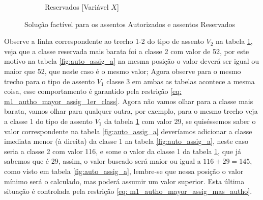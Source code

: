 \begin{figure}[H]
\begin{subfigure}[b]{0.35\linewidth}
		\caption{Reservados [Variável $X$]}
		\label{fig:auto_assig_b}
	\end{subfigure}
	\caption{Solução factível para os assentos Autorizados e assentos Reservados}
	\label{fig:auto_assig}
\end{figure}

Observe a linha correspondente ao trecho 1-2 do tipo de assento $V_2$ na tabela \ref{fig:auto_assig_b}, veja que a classe reservada mais barata foi a classe 2 com valor de 52, por este motivo na tabela \ref{fig:auto_assig_a} na mesma posição o valor deverá ser igual ou maior que 52, que neste caso é o mesmo valor; Agora observe para o mesmo trecho para o tipo de assento $V_1$ classe 3 em ambas as tabelas acontece a mesma coisa, esse comportamento é garantido pela restrição \ref{eq: m1_autho_mayor_assig_1er_class}. Agora não vamos olhar para a classe mais barata, vamos olhar para qualquer outra, por exemplo, para o mesmo trecho veja a classe 1 do tipo de assento $V_1$ da tabela \ref{fig:auto_assig_b} com valor 29, se quiséssemos saber o valor correspondente na tabela \ref{fig:auto_assig_a} deveríamos adicionar a classe imediata menor (à direita) da classe 1 na tabela \ref{fig:auto_assig_a}, neste caso seria a classe 2 com valor 116, e some o valor da classe 1 da tabela \ref{fig:auto_assig_b}, que já sabemos que é 29, assim, o valor buscado será maior ou igual a $116+29 = 145$, como visto em tabela \ref{fig:auto_assig_a}, lembre-se que nessa posição o valor mínimo será o calculado, mas poderá assumir um valor superior. Esta última situação é controlada pela restrição \ref{eq: m1_autho_mayor_assig_mas_autho}.




